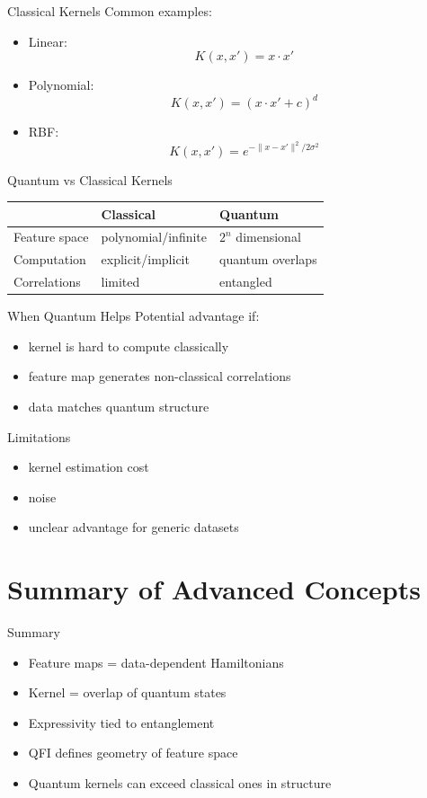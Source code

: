 \documentclass{beamer}
\begin{document}
\begin{frame}{Classical Kernels}
Common examples:
\begin{itemize}
\item Linear:
\[
K(x,x') = x \cdot x'
\]
\item Polynomial:
\[
K(x,x') = (x \cdot x' + c)^d
\]
\item RBF:
\[
K(x,x') = e^{-\|x-x'\|^2 / 2\sigma^2}
\]
\end{itemize}
\end{frame}


\begin{frame}{Quantum vs Classical Kernels}
\begin{tabular}{l|l|l}
 & Classical & Quantum \\
\hline
Feature space & polynomial/infinite & $2^n$ dimensional \\
Computation & explicit/implicit & quantum overlaps \\
Correlations & limited & entangled \\
\end{tabular}
\end{frame}


\begin{frame}{When Quantum Helps}
Potential advantage if:
\begin{itemize}
\item kernel is hard to compute classically
\item feature map generates non-classical correlations
\item data matches quantum structure
\end{itemize}
\end{frame}


\begin{frame}{Limitations}
\begin{itemize}
\item kernel estimation cost
\item noise
\item unclear advantage for generic datasets
\end{itemize}
\end{frame}


\section{Summary of Advanced Concepts}

\begin{frame}{Summary}
\begin{itemize}
\item Feature maps = data-dependent Hamiltonians
\item Kernel = overlap of quantum states
\item Expressivity tied to entanglement
\item QFI defines geometry of feature space
\item Quantum kernels can exceed classical ones in structure
\end{itemize}
\end{frame}
\end{document}

